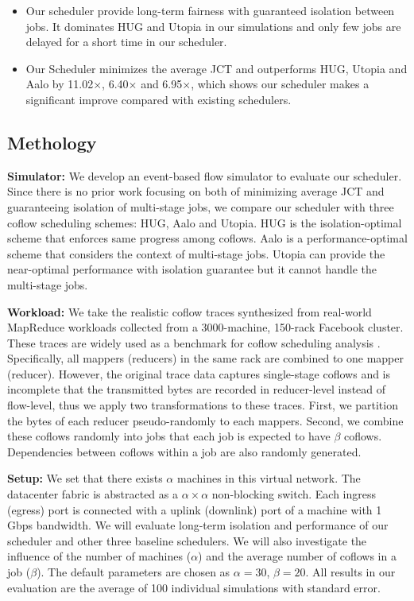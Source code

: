\documentclass[10pt, conference, letterpaper]{IEEEtran}
\begin{document}
\begin{itemize}
	\item Our scheduler provide long-term fairness with guaranteed isolation between jobs. It dominates HUG\cite{HUG} and Utopia\cite{utopia} in our simulations and only few jobs are delayed for a short time in our scheduler.
	\item Our Scheduler minimizes the average JCT and outperforms HUG, Utopia and Aalo by 11.02$\times$, 6.40$\times$ and 6.95$\times$, which shows our scheduler makes a significant improve compared with existing schedulers.
\end{itemize}

\subsection{Methology}\label{evaluation}
\noindent\textbf{Simulator:} We develop an event-based flow simulator to evaluate our scheduler. Since there is no prior work focusing on both of minimizing average JCT and guaranteeing isolation of multi-stage jobs, we compare our scheduler with three coflow scheduling schemes: HUG\cite{HUG}, Aalo\cite{aalo} and Utopia\cite{utopia}. HUG is the isolation-optimal scheme that enforces same progress among coflows. Aalo is a performance-optimal scheme that considers the context of multi-stage jobs. Utopia can provide the near-optimal performance with isolation guarantee but it cannot handle the multi-stage jobs.

\noindent\textbf{Workload:} We take the realistic coflow traces\cite{benchmark} synthesized from real-world MapReduce workloads collected from a 3000-machine, 150-rack Facebook cluster. These traces are widely used as a benchmark for coflow scheduling analysis\cite{varys,aalo,minimizing,fair} . Specifically, all mappers (reducers) in the same rack are combined to one mapper (reducer). However, the original trace data captures single-stage coflows and is incomplete that the transmitted bytes are recorded in reducer-level instead of flow-level, thus we apply two transformations to these traces. First, we partition the bytes of each reducer pseudo-randomly to each mappers. Second, we combine these coflows randomly into jobs that each job is expected to have $\beta$ coflows. Dependencies between coflows within a job are also randomly generated.

\noindent\textbf{Setup:} We set that there exists $\alpha$ machines in this virtual network. The datacenter fabric is abstracted as a $\alpha \times \alpha$ non-blocking switch. Each ingress (egress) port is connected with a uplink (downlink) port of a machine with 1 Gbps bandwidth. %
We will evaluate long-term isolation and performance of our scheduler and other three baseline schedulers. We will also investigate the influence of the number of machines ($\alpha$) and the average number of coflows in a job ($\beta$). The default parameters are chosen as $\alpha = 30$, $\beta = 20$. All results in our evaluation are the average of 100 individual simulations with standard error.
\end{document}
